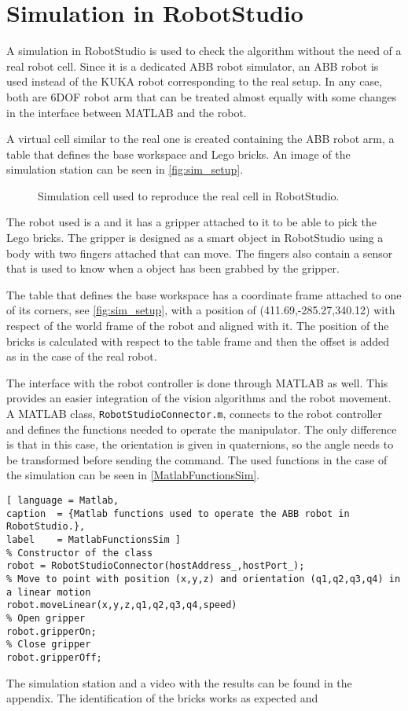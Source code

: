 \chapter{Simulation in RobotStudio}\label{chap:simulation}
A simulation in RobotStudio \cite{robotStudio} is used to check the algorithm without the need of a real robot cell. Since it is a dedicated ABB robot simulator, an ABB robot is used instead of the KUKA robot corresponding to the real setup. In any case, both are 6DOF robot arm that can be treated almost equally with some changes in the interface between MATLAB and the robot. 

A virtual cell similar to the real one is created containing the ABB robot arm, a table that defines the base workspace and Lego bricks. An image of the simulation station can be seen in \autoref{fig:sim_setup}.
\begin{figure}[H]
    \caption{Simulation cell used to reproduce the real cell in RobotStudio.}
    \label{fig:sim_setup}
\end{figure}

The robot used is a  and it has a gripper attached to it to be able to pick the Lego bricks. The gripper is designed as a smart object in RobotStudio using a body with two fingers attached that can move. The fingers also contain a sensor that is used to know when a object has been grabbed by the gripper.

The table that defines the base workspace has a coordinate frame attached to one of its corners, see \autoref{fig:sim_setup}, with a position of (411.69,-285.27,340.12) with respect of the world frame of the robot and aligned with it. The position of the bricks is calculated with respect to the table frame and then the offset is added as in the case of the real robot.

The interface with the robot controller is done through MATLAB as well. This provides an easier integration of the vision algorithms and the robot movement. A MATLAB class, \lstinline[style=matlabinline]{RobotStudioConnector.m}, connects to the robot controller and defines the functions needed to operate the manipulator. The only difference is that in this case, the orientation is given in quaternions, so the angle needs to be transformed before sending the command. The used functions in the case of the simulation can be seen in \autoref{MatlabFunctionsSim}.

\begin{lstlisting}[ language = Matlab,
caption  = {Matlab functions used to operate the ABB robot in RobotStudio.},
label    = MatlabFunctionsSim ]
% Constructor of the class
robot = RobotStudioConnector(hostAddress_,hostPort_);
% Move to point with position (x,y,z) and orientation (q1,q2,q3,q4) in a linear motion
robot.moveLinear(x,y,z,q1,q2,q3,q4,speed)
% Open gripper
robot.gripperOn;
% Close gripper
robot.gripperOff;
\end{lstlisting}

The simulation station and a video with the results can be found in the appendix. The identification of the bricks works as expected and
